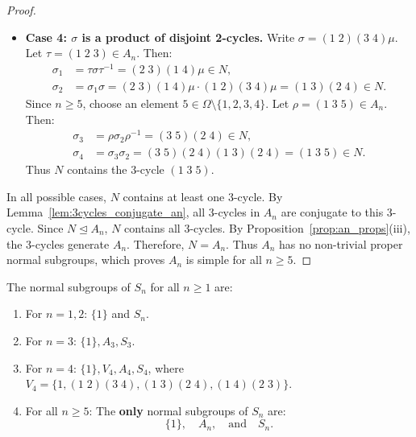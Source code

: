 \begin{proof}
\begin{itemize}[leftmargin=1.5em, itemsep=6pt]
    \item \textbf{Case 4: $\sigma$ is a product of disjoint 2-cycles.}
    Write $\sigma = (1 \; 2)(3 \; 4)\mu$.
    Let $\tau = (1 \; 2 \; 3) \in A_n$.
    Then:
    \begin{align*}
    \sigma_1 &= \tau \sigma \tau^{-1} = (2 \; 3)(1 \; 4)\mu \in N, \\
    \sigma_2 &= \sigma_1 \sigma = (2 \; 3)(1 \; 4)\mu \cdot (1 \; 2)(3 \; 4)\mu = (1 \; 3)(2 \; 4) \in N.
    \end{align*}
    Since $n \ge 5$, choose an element $5 \in \Omega \setminus \{1, 2, 3, 4\}$.
    Let $\rho = (1 \; 3 \; 5) \in A_n$.
    Then:
    \begin{align*}
    \sigma_3 &= \rho \sigma_2 \rho^{-1} = (3 \; 5)(2 \; 4) \in N, \\
    \sigma_4 &= \sigma_3 \sigma_2 = (3 \; 5)(2 \; 4)(1 \; 3)(2 \; 4) = (1 \; 3 \; 5) \in N.
    \end{align*}
    Thus $N$ contains the 3-cycle $(1 \; 3 \; 5)$.
\end{itemize}
In all possible cases, $N$ contains at least one 3-cycle.
By Lemma~\ref{lem:3cycles_conjugate_an}, all 3-cycles in $A_n$ are conjugate to this 3-cycle.
Since $N \trianglelefteq A_n$, $N$ contains all 3-cycles.
By Proposition~\ref{prop:an_props}(iii), the 3-cycles generate $A_n$.
Therefore, $N = A_n$.
Thus $A_n$ has no non-trivial proper normal subgroups, which proves $A_n$ is simple for all $n \ge 5$.
\end{proof}

\begin{theorem}
\label{thm:normal_subgroups_sn}
The normal subgroups of $S_n$ for all $n \ge 1$ are:
\begin{enumerate}[label=\textbf{(\arabic*)}, leftmargin=*, itemsep=4pt]
    \item For $n = 1, 2$: $\{1\}$ and $S_n$.
    \item For $n = 3$: $\{1\}, A_3, S_3$.
    \item For $n = 4$: $\{1\}, V_4, A_4, S_4$, where $V_4 = \{ 1, (1 \; 2)(3 \; 4), (1 \; 3)(2 \; 4), (1 \; 4)(2 \; 3) \}$.
    \item For all $n \ge 5$: The \textbf{only} normal subgroups of $S_n$ are:
    \begin{equation}
    \{ 1 \}, \quad A_n, \quad \text{and} \quad S_n.
    \end{equation}
\end{enumerate}
\end{theorem}

